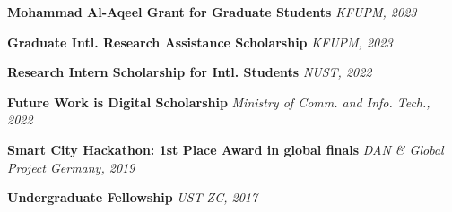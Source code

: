 \textbf{Mohammad Al-Aqeel Grant for Graduate Students} \hfill{\textit{KFUPM, 2023}}

\textbf{Graduate Intl. Research Assistance Scholarship} \hfill {\textit{KFUPM, 2023}}

\textbf{Research Intern Scholarship for Intl. Students} \hfill \textit{NUST, 2022}

\textbf{Future Work is Digital Scholarship} \hfill {\textit{Ministry of Comm. and Info. Tech., 2022}}

\textbf{Smart City Hackathon: 1st Place Award in global finals} \hfill {\textit{DAN \& Global Project Germany, 2019}}

\textbf{Undergraduate Fellowship} \hfill {\textit{UST-ZC, 2017}}